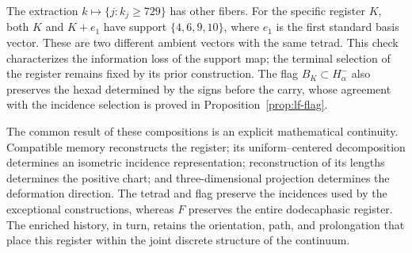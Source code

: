 The extraction \(k\mapsto\{j:k_j\geq729\}\) has other fibers.
For the specific register \(K\), both \(K\) and \(K+e_1\)
have support \(\{4,6,9,10\}\), where \(e_1\) is the first
standard basis vector. These are two different ambient vectors with
the same tetrad. This check characterizes the information loss of the
support map; the terminal selection of the register remains fixed by
its prior construction. The flag \(B_K\subset H^-_\alpha\) also
preserves the hexad determined by the signs before the carry, whose
agreement with the incidence selection is proved in
Proposition~\ref{prop:lf-flag}.

The common result of these compositions is an explicit mathematical
continuity. Compatible memory reconstructs the register; its
uniform--centered decomposition determines an isometric incidence
representation; reconstruction of its lengths determines the positive
chart; and three-dimensional projection determines the deformation
direction. The tetrad and flag preserve the incidences used by the
exceptional constructions, whereas \(F\) preserves the entire
dodecaphasic register. The enriched history, in turn, retains the
orientation, path, and prolongation that place this register within
the joint discrete structure of the continuum.
